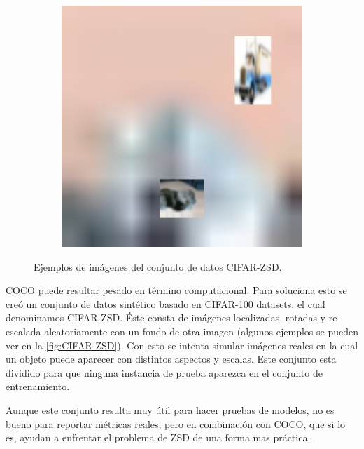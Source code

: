 \begin{figure}[H]
\begin{center}
\begin{subfigure}{.3\textwidth}
		\label{fig:ex2}
	\end{subfigure}
	\begin{subfigure}{.3\textwidth}
		\includegraphics[width=1\textwidth]{img/cifar-zsd-test283.jpg}
		\label{fig:ex3}
	\end{subfigure}
	\caption{Ejemplos de imágenes del conjunto de datos CIFAR-ZSD.}
	\label{fig:CIFAR-ZSD}
	\end{center}
\end{figure}

COCO puede resultar pesado en término computacional. Para soluciona esto se creó un conjunto de datos sintético basado en CIFAR-100 datasets, el cual denominamos CIFAR-ZSD. Éste consta de imágenes localizadas, rotadas y re-escalada aleatoriamente con un fondo de otra imagen (algunos ejemplos se pueden ver en la \autoref{fig:CIFAR-ZSD}). Con esto se intenta simular imágenes reales en la cual un objeto puede aparecer con distintos aspectos y escalas. Este conjunto esta dividido para que ninguna instancia de prueba  aparezca en el conjunto de entrenamiento.

Aunque este conjunto resulta muy útil para hacer pruebas de modelos, no es bueno para reportar métricas reales, pero en combinación con COCO, que si lo es, ayudan a enfrentar el problema de ZSD de una forma mas práctica.

